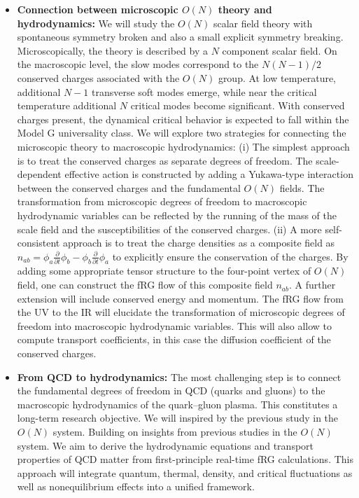\documentclass[letterpaper,11pt]{article}
\begin{document}
\begin{itemize}
\item {\bf Connection between microscopic $O(N)$ theory and hydrodynamics:} We will study the $O(N)$ scalar field theory with spontaneous symmetry broken and also a small explicit symmetry breaking. Microscopically, the theory is described by a $N$ component scalar field. On the macroscopic level, the slow modes correspond to the $N(N-1)/2$ conserved charges associated with the $O(N)$ group. At low temperature, additional $N-1$ transverse soft modes emerge, while near the critical temperature additional $N$ critical modes become significant. With conserved charges present, the dynamical critical behavior is expected to fall within the Model G universality class. We will explore two strategies for connecting the microscopic theory to macroscopic hydrodynamics: (i) The simplest approach is to treat the conserved charges as separate degrees of freedom. The scale-dependent effective action is constructed by adding a Yukawa-type interaction between the conserved charges and the fundamental $O(N)$ fields. The transformation from microscopic degrees of freedom to macroscopic hydrodynamic variables can be reflected by the running of the mass of the scale field and the susceptibilities of the conserved charges. (ii) A more self-consistent approach is to treat the charge densities as a composite field as $n_{a b}=\phi_a \frac{\partial}{\partial t} \phi_b-\phi_b \frac{\partial}{\partial t} \phi_a$ to explicitly ensure the conservation of the charges. By adding some appropriate tensor structure to the four-point vertex of $O(N)$ field, one can construct the fRG flow of this composite field $n_{ab}$. A further extension will include conserved energy and momentum. The fRG flow from the UV to the IR will elucidate the transformation of microscopic degrees of freedom into macroscopic hydrodynamic variables. This will also allow to compute transport coefficients, in this case the diffusion coefficient of the conserved charges.



\item {\bf From QCD to hydrodynamics:} The most challenging step is to connect the fundamental degrees of freedom in QCD (quarks and gluons) to the macroscopic hydrodynamics of the quark–gluon plasma. This constitutes a long-term research objective. We will inspired by the previous study in the $O(N)$ system. Building on insights from previous studies in the $O(N)$ system. We aim to derive the hydrodynamic equations and transport properties of QCD matter from first-principle real-time fRG calculations. This approach will integrate quantum, thermal, density, and critical fluctuations as well as nonequilibrium effects into a unified framework.


\end{itemize}
% 
\printbibliography
\end{document}
